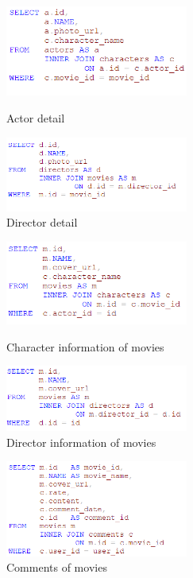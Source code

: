 \begin{CJK*}{UTF8}{gbsn}
\begin{figure}[htbp]
\centering
\label{detail}
\begin{minipage}[t]{0.45\textwidth}
\centering
\includegraphics[width=6cm]{a_detail.png}
\caption{Actor detail}
\end{minipage}
\begin{minipage}[t]{0.45\textwidth}
\centering
\includegraphics[width=6cm]{d_detail.png}
\caption{Director detail}
\end{minipage}
\end{figure}


\begin{figure}[htbp]
\centering
\label{detail}
\begin{minipage}[t]{0.45\textwidth}
\centering
\includegraphics[width=6cm]{m_detail_char.png}
\caption{Character information of movies}
\end{minipage}
\begin{minipage}[t]{0.45\textwidth}
\centering
\includegraphics[width=6cm]{m_detail_dir.png}
\caption{Director information of movies}
\end{minipage}
\end{figure}

\begin{figure}[htbp]
\centering
\includegraphics[width=6cm]{m_detail_com.png}
\caption{Comments of movies}
\end{figure}



\end{CJK*}
